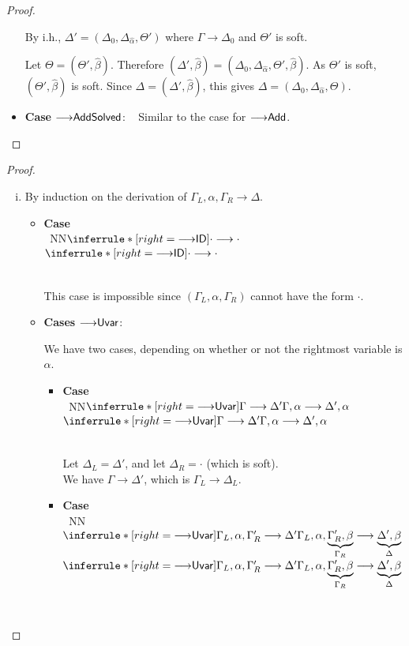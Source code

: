\documentclass[a4paper]{article}
\newcommand{\emptyctx}{\cdot}
\newcommand{\ProofCaseRule}[1]{\item \textbf{Case }\textrm{{#1}}: ~ }
\newcommand{\ProofCasesRules}[1]{\item \textbf{Cases }\textrm{{#1}}: ~ }
\gdef\xxDerivationProofCaseColor{N}
\newcommand{\DerivationProofCase}[3]{\smallskip
     \item \parbox[t]{100ex}{\textbf{Case } \\[-0.5em]
       $~$\hspace{5ex}
       \if\xxDerivationProofCaseColor N\ensuremath{\Infer{#1}{#2}{#3}}
       \else \colorbox{\xxDerivationProofCaseColor}{\ensuremath{\Infer{#1}{#2}{#3}}}\fi }\nopagebreak \\[-0.8ex]
  }
\newcommand{\Infer}[3]{\inferrule*[right={\text{\strut#1}}]{{}#2\mathstrut}{{}#3\mathstrut}}
\newcommand{\extendssym}{\longrightarrow}
\newcommand{\extends}[2]{{#1} \extendssym {#2}}
\newcommand{\substextend}[2]{\extends{#1}{#2}}
\newcommand{\ahat}{\hat{\alpha}}
\newcommand{\bhat}{\hat{\beta}}
\newcommand{\rulename}[1]{\text{\normalfont\textsf{#1}}}
\newcommand{\substextendrulename}[1]{\ensuremath{{\extendssym}{\rulename{#1}}}\xspace}
\newcommand{\substextendId}{\substextendrulename{ID}}
\newcommand{\substextendUU}{\substextendrulename{Uvar}}
\newcommand{\substextendAdd}{\substextendrulename{Add}}
\newcommand{\substextendAddSolved}{\substextendrulename{AddSolved}}
\begin{document}
\begin{proof}
\begin{itemize}
           By i.h., $\Delta' = (\Delta_0, \Delta_{\ahat}, \Theta')$ where $\substextend{\Gamma}{\Delta_0}$
           and $\Theta'$ is soft.
           
           Let $\Theta = (\Theta', \bhat)$.
           Therefore $(\Delta', \bhat) = (\Delta_0, \Delta_{\ahat}, \Theta', \bhat)$.
           As $\Theta'$ is soft, $(\Theta', \bhat)$ is soft.
           Since $\Delta = (\Delta', \bhat)$, this gives $\Delta = (\Delta_0, \Delta_{\ahat}, \Theta)$.

      \ProofCaseRule{\substextendAddSolved}
          Similar to the case for \substextendAdd.
\qedhere
  \end{itemize}
\end{proof}



\extensionorder*
\begin{proof}
  \begin{enumerate}[(i)]
  \item 
    By induction on the derivation of $\substextend{\Gamma_L, \alpha, \Gamma_R}{\Delta}$.

      \begin{itemize}
        \DerivationProofCase{\substextendId}
            { }
            { \substextend{\emptyctx}{\emptyctx} }

            This case is impossible since $(\Gamma_L, \alpha, \Gamma_R)$ cannot have the form $\cdot$.

       \ProofCasesRules{\substextendUU}

           We have two cases, depending on whether or not the rightmost variable is $\alpha$.

           \begin{itemize}
            \DerivationProofCase{\substextendUU}
                { \substextend{\Gamma}{\Delta'} }
                { \substextend{\Gamma, \alpha}{\Delta', \alpha} }

                Let $\Delta_L = \Delta'$, and let $\Delta_R = \cdot$ (which is soft). \\
                We have $\substextend{\Gamma}{\Delta'}$, which is
                $\substextend{\Gamma_L}{\Delta_L}$.
             
            \DerivationProofCase{\substextendUU}
                { \substextend{\Gamma_L, \alpha, \Gamma'_R}{\Delta'} }
                { \substextend{\Gamma_L, \alpha, \underbrace{\Gamma'_R, \beta}_{\Gamma_R}}
                  {\underbrace{\Delta', \beta}_{\Delta}} }


\end{itemize}
\end{itemize}
\end{enumerate}
\end{proof}
\end{document}
